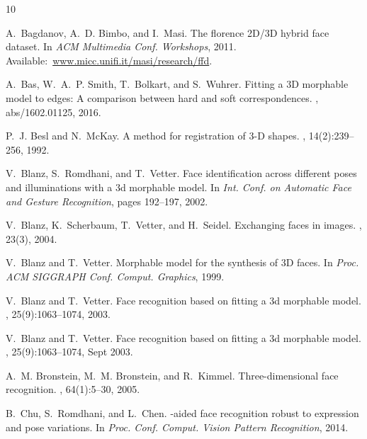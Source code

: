 \documentclass[10pt,twocolumn,letterpaper]{article}
\begin{document}
{\small

%
\begin{thebibliography}{10}\itemsep=-1pt

A.~Bagdanov, A.~D. Bimbo, and I.~Masi.
\newblock The florence {2D/3D} hybrid face dataset.
\newblock In {\em ACM Multimedia Conf. Workshops}, 2011.
\newblock Available:~\url{www.micc.unifi.it/masi/research/ffd}.

A.~Bas, W.~A.~P. Smith, T.~Bolkart, and S.~Wuhrer.
\newblock Fitting a {3D} morphable model to edges: {A} comparison between hard
  and soft correspondences.
, abs/1602.01125, 2016.

P.~J. Besl and N.~McKay.
\newblock A method for registration of {3-D} shapes.
, 14(2):239--256, 1992.

V.~Blanz, S.~Romdhani, and T.~Vetter.
\newblock Face identification across different poses and illuminations with a
  3d morphable model.
\newblock In {\em Int. Conf. on Automatic Face and Gesture Recognition}, pages
  192--197, 2002.

V.~Blanz, K.~Scherbaum, T.~Vetter, and H.~Seidel.
\newblock Exchanging faces in images.
, 23(3), 2004.

V.~Blanz and T.~Vetter.
\newblock Morphable model for the synthesis of {3D} faces.
\newblock In {\em Proc. ACM SIGGRAPH Conf. Comput. Graphics}, 1999.

V.~Blanz and T.~Vetter.
\newblock Face recognition based on fitting a 3d morphable model.
, 25(9):1063--1074, 2003.

V.~Blanz and T.~Vetter.
\newblock Face recognition based on fitting a 3d morphable model.
, 25(9):1063--1074, Sept
  2003.

A.~M. Bronstein, M.~M. Bronstein, and R.~Kimmel.
\newblock Three-dimensional face recognition.
, 64(1):5--30, 2005.

B.~Chu, S.~Romdhani, and L.~Chen.
-aided face recognition robust to expression and pose variations.
\newblock In {\em Proc. Conf. Comput. Vision Pattern Recognition}, 2014.


\end{thebibliography}}
\end{document}
